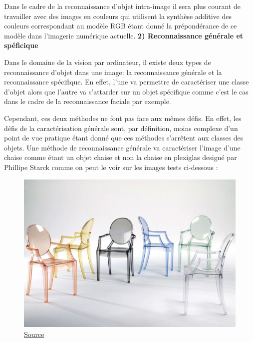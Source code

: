 \documentclass[a4paper,12pt]{article} %
\begin{document}
\par
Dans le cadre de la reconnaissance d’objet intra-image il sera plus courant de travailler avec des images en couleurs qui utilisent la synthèse additive des couleurs correspondant au modèle RGB étant donné la prépondérance de ce modèle dans l’imagerie numérique actuelle.\newline
\newpage
\textbf{2) Reconnaissance générale et spéficique}
\newline
\par
	Dans le domaine de la vision par ordinateur, il existe deux types de reconnaissance d'objet dans une image: la reconnaissance générale et la reconnaissance spécifique. En effet, l’une va permettre de caractériser une classe d’objet alors que l’autre va s’attarder sur un objet spécifique comme c’est le cas dans le cadre de la reconnaissance faciale par exemple. 
\newline
\par
Cependant, ces deux méthodes ne font pas face aux mêmes défis. En effet, les défis de la caractérisation générale sont, par définition, moins complexe d’un point de vue pratique étant donné que ces méthodes s’arrêtent aux classes des objets. Une méthode de reconnaissance générale va caractériser l’image d’une chaise comme étant un objet chaise et non la chaise en plexiglas designé par Phillipe Starck comme on peut le voir sur les images tests ci-dessous : 
\newline
\begin{figure}[h] %
  \centering %
  \includegraphics[scale=0.2]{stark.jpg} %
  \caption{\href{https://www.elle.fr/Deco/Reportages/Les-pros/Philippe-Starck-le-designer-star-en-dix-realisations-iconiques}{Source} }
\end{figure}
\end{document}
